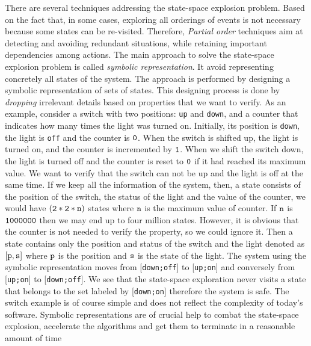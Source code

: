                    
There are several techniques addressing the state-space explosion problem.
Based on the fact that, in some cases, exploring all orderings of events is not necessary because some states can be re-visited. Therefore, \emph{Partial order} techniques aim at detecting and avoiding
redundant situations, while retaining important dependencies among
actions. The main approach to solve the state-space explosion problem is
called \emph{symbolic
   representation}. It avoid representing concretely all states of the system. The approach is performed by designing a symbolic representation of sets of states.
This designing process is done by \emph{dropping} irrelevant details based on properties that we want to verify. 
As an example, consider a switch with two positions: {\tt up} and {\tt down}, and a counter that indicates how many times the light was turned on. Initially, its position is {\tt down}, the light is {\tt off} and the counter is $\tt 0$. When the switch is shifted up, the light is turned on, and the counter is incremented by $\tt 1$. When we shift the switch down, the light is turned off and the counter is reset to $\tt 0$ if it had reached its maximum value. We want to verify that the switch can not be up and the light is off at the same time. If we keep all the information of the system, then, a state consists of the position of the switch, the status of the light and the value of the counter, we would have $\tt (2*2*n)$ states where $\tt n$ is the maximum value of counter. If $\tt n$ is $\tt 1000000$ then we may end up to four million states.  However, it is obvious that the counter is not needed to verify the property, so we could ignore it. %
 Then a state contains only the position and status of the switch and the light denoted as $\tt [p,s]$ where $\tt p$ is the position and $\tt s$ is the state of the light. The system using the symbolic representation moves from  [{\tt down;off}]  to  [{\tt up;on}]  and conversely from  [{\tt up;on}]  to  [{\tt down;off}]. We see that the state-space exploration never visits a state that belongs to the set labeled by  [{\tt down;on}]  therefore the system is safe. The switch example is of course simple and does not reflect the complexity of today’s software. Symbolic representations are of crucial help to combat the state-space explosion, accelerate the algorithms and get them to terminate in a reasonable amount of time


